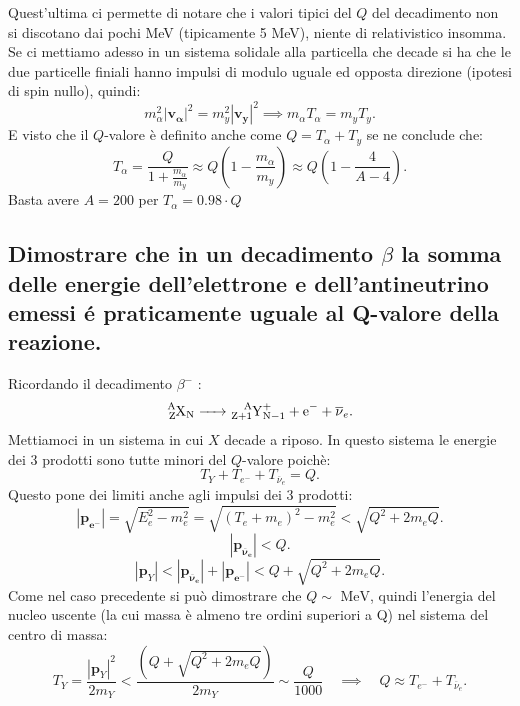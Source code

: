 Quest'ultima ci permette di notare che i valori tipici del $Q$ del decadimento non si discotano dai pochi MeV (tipicamente 5 MeV), niente di relativistico insomma.\\
Se ci mettiamo adesso in un sistema solidale alla particella che decade si ha che le due particelle finiali hanno impulsi di modulo uguale ed opposta direzione (ipotesi di spin nullo), quindi:
\[
m_{\alpha}^2 \left| \boldsymbol{v_{\alpha}} \right|^2 = m_{y}^2 \left| \boldsymbol{v_{y}} \right|^2 \implies m_{\alpha} T_{\alpha} = m_{y}T_{y}
.\]
E visto che il $Q$-valore è definito anche come  $Q = T_{\alpha} + T_{y}$ se ne conclude che:
\[
	T_{\alpha} = \frac{Q}{1 + \frac{m_{\alpha}}{m_{y}}} \approx Q\left( 1-\frac{m_{\alpha}}{m_y} \right) \approx Q\left( 1-\frac{4}{A-4} \right) 
.\] 
Basta avere $A = 200$ per  $T_{\alpha} = 0.98\cdot Q$

\subsection[]{ Dimostrare che in un decadimento $\beta$ la somma delle energie dell'elettrone e dell'antineutrino emessi é praticamente uguale al Q-valore della reazione.}
Ricordando il decadimento $\beta^-$ :
\[
\ce{\ce{^{A}_{Z}X_{N}} -> \ce{^{A}_{Z+1}Y^+_{N-1}} + e^- + \overline{\nu}_e}
.\]
Mettiamoci in un sistema in cui $X$ decade a riposo. In questo sistema le energie dei 3 prodotti sono tutte minori del $Q$-valore poichè:
\[
T_Y + T_{e^-} + T_{\overline{\nu}_e} = Q
.\] 
Questo pone dei limiti anche agli impulsi dei 3 prodotti:
\[
	\left| \boldsymbol{p_{e^-}} \right| = \sqrt{E_e^2 - m_e^2}  = \sqrt{\left( T_e + m_e \right)^2 - m_e^2 } < \sqrt{Q^2+2m_eQ}  
.\] 
\[
	\left| \boldsymbol{p_{\overline{\nu}_e}} \right| < Q 
.\]
\[
\left| \boldsymbol{p}_Y \right| <  \left| \boldsymbol{p_{\overline{\nu}_e}} \right| + \left| \boldsymbol{p_{e^-}} \right| < Q + \sqrt{Q^2+2m_eQ} 
.\] 
Come nel caso precedente si può dimostrare che $Q \sim \text{ MeV}$, quindi l'energia del nucleo uscente (la cui massa è almeno tre ordini superiori a Q) nel sistema del centro di massa:
\[
	T_{Y} = \frac{\left| \boldsymbol{p}_Y \right|^2 }{2m_Y} < \frac{\left( Q + \sqrt{Q^2+2m_e Q}  \right) }{2m_Y}  \sim \frac{Q}{1000} \quad \implies
	\quad Q \approx T_{e^-} + T_{\overline{\nu}_e} 
.\] 
